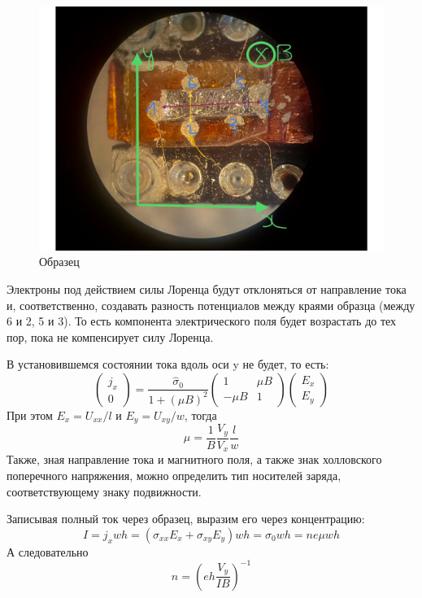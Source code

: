 \documentclass[a4paper, 12pt]{article}
\begin{document}
\begin{figure}[H]
	\centering
	\includegraphics[width=\linewidth]{3_Sample2.pdf}
	\caption{Образец}
	\label{fig:3_sample2}
\end{figure}
Электроны под действием силы Лоренца будут отклоняться от направление тока и, соответственно, создавать разность потенциалов между краями образца (между 6 и 2, 5 и 3). То есть компонента электрического поля будет возрастать до тех пор, пока не компенсирует силу Лоренца. 

В установившемся состоянии тока вдоль оси y не будет, то есть: 
\begin{equation}
	\left(\begin{array}{c}
		j_x \\
		0
	\end{array}\right)=\frac{\hat{\sigma}_{0}}{1+(\mu B)^{2}}\left(\begin{array}{cc}
		1 & \mu B \\
		-\mu B & 1
	\end{array}\right)\left(\begin{array}{c}
		E_{x} \\
		E_{y}
	\end{array}\right)
\end{equation}
При этом $E_x=U_{xx}/l$ и $E_y=U_{xy}/w$, тогда
\begin{equation}
	\mu=\frac{1}{B}\frac{V_y}{V_x}\frac{l}{w}
\end{equation}
Также, зная направление тока и магнитного поля, а также знак холловского поперечного напряжения, можно определить тип носителей заряда, соответствующему знаку подвижности.

Записывая полный ток через образец, выразим его через концентрацию:
\begin{equation}
	I=j_xwh=(\sigma_{xx}E_x+\sigma_{xy}E_y)wh=\sigma_0 wh=ne\mu wh
\end{equation}
А следовательно
\begin{equation}
	n=\left(eh\frac{V_y}{IB}\right)^{-1}
\end{equation}
\end{document}
